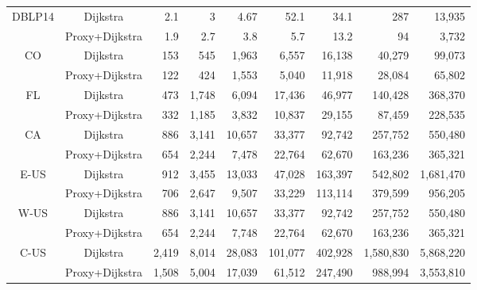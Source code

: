 \begin{table}[t!]
\begin{center}
\begin{tabular}{|c|c||r|r|r|r|r|r|r|}
\multirow{2}{*}{DBLP14} & Dijkstra & 2.1 & 3 & 4.67 & 52.1 & 34.1 & 287 & 13,935 \\ \cline{2-9}
                      & Proxy+Dijkstra & 1.9 & 2.7 & 3.8 & 5.7 & 13.2 & 94 & 3,732 \\ \hline
\multirow{2}{*}{CO}  & Dijkstra & 153 & 545 & 1,963 & 6,557 & 16,138 & 40,279 & 99,073 \\ \cline{2-9}
                  & Proxy+Dijkstra  & 122 & 424 & 1,553 & 5,040 & 11,918 & 28,084 & 65,802 \\ \hline
\multirow{2}{*}{FL}  & Dijkstra & 473 & 1,748 & 6,094 & 17,436 & 46,977 & 140,428 & 368,370 \\ \cline{2-9}
                   & Proxy+Dijkstra & 332 & 1,185 & 3,832 & 10,837 & 29,155 & 87,459 & 228,535 \\ \hline
\multirow{2}{*}{CA}  & Dijkstra & 886 & 3,141 & 10,657 & 33,377 & 92,742 & 257,752 & 550,480 \\ \cline{2-9}
                   & Proxy+Dijkstra & 654 & 2,244 & 7,478 & 22,764 & 62,670 & 163,236 & 365,321 \\ \hline
\multirow{2}{*}{E-US} & Dijkstra&912 & 3,455 & 13,033 & 47,028 & 163,397 & 542,802 & 1,681,470 \\ \cline{2-9}
                   & Proxy+Dijkstra & 706 & 2,647 & 9,507 & 33,229 & 113,114 & 379,599 & 956,205 \\ \hline
\multirow{2}{*}{W-US} & Dijkstra & 886 & 3,141 & 10,657 & 33,377 & 92,742 & 257,752 & 550,480 \\ \cline{2-9}
                   & Proxy+Dijkstra & 654 & 2,244 & 7,748 & 22,764 & 62,670 & 163,236 & 365,321 \\ \hline
\multirow{2}{*}{C-US} & Dijkstra & 2,419 & 8,014 & 28,083 & 101,077 & 402,928 & 1,580,830 & 5,868,220 \\ \cline{2-9}
                   & Proxy+Dijkstra & 1,508 & 5,004 & 17,039 & 61,512 & 247,490 & 988,994 & 3,553,810 \\ \hline
\end{tabular}
\end{center}
\vspace{-2ex}
\end{table}

